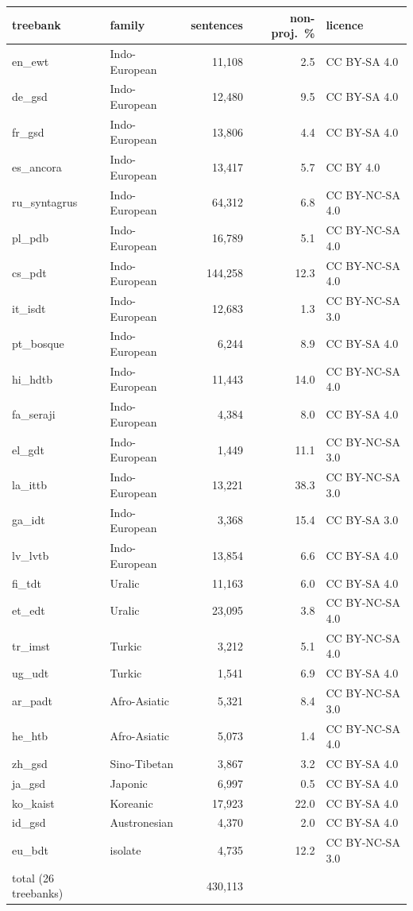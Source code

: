 \begin{tabular}{llrrl}
\toprule
treebank & family & sentences & non-proj.\ \% & licence \\
\midrule
en\_ewt & Indo-European & 11,108 & 2.5 & CC BY-SA 4.0 \\
de\_gsd & Indo-European & 12,480 & 9.5 & CC BY-SA 4.0 \\
fr\_gsd & Indo-European & 13,806 & 4.4 & CC BY-SA 4.0 \\
es\_ancora & Indo-European & 13,417 & 5.7 & CC BY 4.0 \\
ru\_syntagrus & Indo-European & 64,312 & 6.8 & CC BY-NC-SA 4.0 \\
pl\_pdb & Indo-European & 16,789 & 5.1 & CC BY-NC-SA 4.0 \\
cs\_pdt & Indo-European & 144,258 & 12.3 & CC BY-NC-SA 4.0 \\
it\_isdt & Indo-European & 12,683 & 1.3 & CC BY-NC-SA 3.0 \\
pt\_bosque & Indo-European & 6,244 & 8.9 & CC BY-SA 4.0 \\
hi\_hdtb & Indo-European & 11,443 & 14.0 & CC BY-NC-SA 4.0 \\
fa\_seraji & Indo-European & 4,384 & 8.0 & CC BY-SA 4.0 \\
el\_gdt & Indo-European & 1,449 & 11.1 & CC BY-NC-SA 3.0 \\
la\_ittb & Indo-European & 13,221 & 38.3 & CC BY-NC-SA 3.0 \\
ga\_idt & Indo-European & 3,368 & 15.4 & CC BY-SA 3.0 \\
lv\_lvtb & Indo-European & 13,854 & 6.6 & CC BY-SA 4.0 \\
fi\_tdt & Uralic & 11,163 & 6.0 & CC BY-SA 4.0 \\
et\_edt & Uralic & 23,095 & 3.8 & CC BY-NC-SA 4.0 \\
tr\_imst & Turkic & 3,212 & 5.1 & CC BY-NC-SA 4.0 \\
ug\_udt & Turkic & 1,541 & 6.9 & CC BY-SA 4.0 \\
ar\_padt & Afro-Asiatic & 5,321 & 8.4 & CC BY-NC-SA 3.0 \\
he\_htb & Afro-Asiatic & 5,073 & 1.4 & CC BY-NC-SA 4.0 \\
zh\_gsd & Sino-Tibetan & 3,867 & 3.2 & CC BY-SA 4.0 \\
ja\_gsd & Japonic & 6,997 & 0.5 & CC BY-SA 4.0 \\
ko\_kaist & Koreanic & 17,923 & 22.0 & CC BY-SA 4.0 \\
id\_gsd & Austronesian & 4,370 & 2.0 & CC BY-SA 4.0 \\
eu\_bdt & isolate & 4,735 & 12.2 & CC BY-NC-SA 3.0 \\
\midrule
total (26 treebanks) & & 430,113 & & \\
\bottomrule
\end{tabular}
